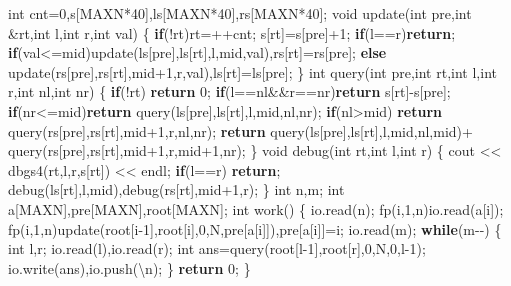 \documentclass[
]{article}
\newenvironment{Shaded}{}{}
\newcommand{\CharTok}[1]{\textcolor[rgb]{0.25,0.44,0.63}{#1}}
\newcommand{\ControlFlowTok}[1]{\textcolor[rgb]{0.00,0.44,0.13}{\textbf{#1}}}
\newcommand{\DataTypeTok}[1]{\textcolor[rgb]{0.56,0.13,0.00}{#1}}
\newcommand{\DecValTok}[1]{\textcolor[rgb]{0.25,0.63,0.44}{#1}}
\newcommand{\NormalTok}[1]{#1}
\newcommand{\SpecialCharTok}[1]{\textcolor[rgb]{0.25,0.44,0.63}{#1}}
\begin{document}
\begin{Shaded}
\begin{Highlighting}[]
\DataTypeTok{int}\NormalTok{ cnt=}\DecValTok{0}\NormalTok{,s[MAXN*}\DecValTok{40}\NormalTok{],ls[MAXN*}\DecValTok{40}\NormalTok{],rs[MAXN*}\DecValTok{40}\NormalTok{];}
\DataTypeTok{void}\NormalTok{ update(}\DataTypeTok{int}\NormalTok{ pre,}\DataTypeTok{int}\NormalTok{ \&rt,}\DataTypeTok{int}\NormalTok{ l,}\DataTypeTok{int}\NormalTok{ r,}\DataTypeTok{int}\NormalTok{ val)}
\NormalTok{\{}
    \ControlFlowTok{if}\NormalTok{(!rt)rt=++cnt; s[rt]=s[pre]+}\DecValTok{1}\NormalTok{; }\ControlFlowTok{if}\NormalTok{(l==r)}\ControlFlowTok{return}\NormalTok{;}
    \ControlFlowTok{if}\NormalTok{(val\textless{}=mid)update(ls[pre],ls[rt],l,mid,val),rs[rt]=rs[pre];}
    \ControlFlowTok{else}\NormalTok{ update(rs[pre],rs[rt],mid+}\DecValTok{1}\NormalTok{,r,val),ls[rt]=ls[pre];}
\NormalTok{\}}
\DataTypeTok{int}\NormalTok{ query(}\DataTypeTok{int}\NormalTok{ pre,}\DataTypeTok{int}\NormalTok{ rt,}\DataTypeTok{int}\NormalTok{ l,}\DataTypeTok{int}\NormalTok{ r,}\DataTypeTok{int}\NormalTok{ nl,}\DataTypeTok{int}\NormalTok{ nr)}
\NormalTok{\{}
    \ControlFlowTok{if}\NormalTok{(!rt) }\ControlFlowTok{return} \DecValTok{0}\NormalTok{;}
    \ControlFlowTok{if}\NormalTok{(l==nl\&\&r==nr)}\ControlFlowTok{return}\NormalTok{ s[rt]{-}s[pre];}
    \ControlFlowTok{if}\NormalTok{(nr\textless{}=mid)}\ControlFlowTok{return}\NormalTok{ query(ls[pre],ls[rt],l,mid,nl,nr);}
    \ControlFlowTok{if}\NormalTok{(nl\textgreater{}mid) }\ControlFlowTok{return}\NormalTok{ query(rs[pre],rs[rt],mid+}\DecValTok{1}\NormalTok{,r,nl,nr);}
    \ControlFlowTok{return}\NormalTok{ query(ls[pre],ls[rt],l,mid,nl,mid)+}
\NormalTok{        query(rs[pre],rs[rt],mid+}\DecValTok{1}\NormalTok{,r,mid+}\DecValTok{1}\NormalTok{,nr);}
\NormalTok{\}}
\DataTypeTok{void}\NormalTok{ debug(}\DataTypeTok{int}\NormalTok{ rt,}\DataTypeTok{int}\NormalTok{ l,}\DataTypeTok{int}\NormalTok{ r)}
\NormalTok{\{}
\NormalTok{    cout \textless{}\textless{} dbgs4(rt,l,r,s[rt]) \textless{}\textless{} endl;}
    \ControlFlowTok{if}\NormalTok{(l==r) }\ControlFlowTok{return}\NormalTok{;}
\NormalTok{    debug(ls[rt],l,mid),debug(rs[rt],mid+}\DecValTok{1}\NormalTok{,r);}
\NormalTok{\}}
\DataTypeTok{int}\NormalTok{ n,m;}
\DataTypeTok{int}\NormalTok{ a[MAXN],pre[MAXN],root[MAXN];}
\DataTypeTok{int}\NormalTok{ work()}
\NormalTok{\{}
\NormalTok{    io.read(n);}
\NormalTok{    fp(i,}\DecValTok{1}\NormalTok{,n)io.read(a[i]);}
\NormalTok{    fp(i,}\DecValTok{1}\NormalTok{,n)update(root[i{-}}\DecValTok{1}\NormalTok{],root[i],}\DecValTok{0}\NormalTok{,N,pre[a[i]]),pre[a[i]]=i;}
\NormalTok{    io.read(m);}
    \ControlFlowTok{while}\NormalTok{(m{-}{-})}
\NormalTok{    \{}
        \DataTypeTok{int}\NormalTok{ l,r; io.read(l),io.read(r);}
        \DataTypeTok{int}\NormalTok{ ans=query(root[l{-}}\DecValTok{1}\NormalTok{],root[r],}\DecValTok{0}\NormalTok{,N,}\DecValTok{0}\NormalTok{,l{-}}\DecValTok{1}\NormalTok{);}
\NormalTok{        io.write(ans),io.push(}\CharTok{\textquotesingle{}}\SpecialCharTok{\textbackslash{}n}\CharTok{\textquotesingle{}}\NormalTok{);}
\NormalTok{    \}}
    \ControlFlowTok{return} \DecValTok{0}\NormalTok{;}
\NormalTok{\}}
\end{Highlighting}
\end{Shaded}
\end{document}
